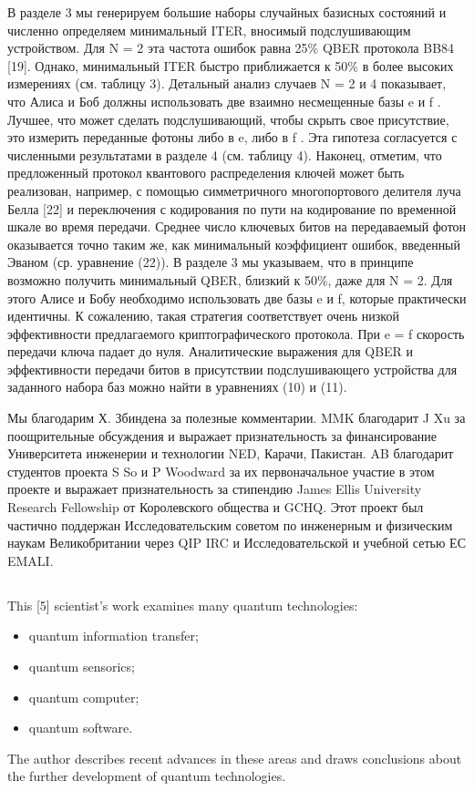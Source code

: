 В разделе 3 мы генерируем большие наборы случайных базисных состояний и численно определяем минимальный ITER, вносимый подслушивающим устройством. Для N = 2 эта частота ошибок равна 25\% QBER протокола BB84 [19]. Однако, минимальный ITER быстро приближается к 50\% в более высоких измерениях (см. таблицу 3). Детальный анализ случаев N = 2 и 4 показывает, что Алиса и Боб должны использовать две взаимно несмещенные базы e и f . Лучшее, что может сделать подслушивающий, чтобы скрыть свое присутствие, это измерить переданные фотоны либо в e, либо в f . Эта гипотеза согласуется с численными результатами в разделе 4 (см. таблицу 4). Наконец, отметим, что предложенный протокол квантового распределения ключей может быть реализован, например, с помощью симметричного многопортового делителя луча Белла [22] и переключения с кодирования по пути на кодирование по временной шкале во время передачи. Среднее число ключевых битов на передаваемый фотон оказывается точно таким же, как минимальный коэффициент ошибок, введенный Эваном (ср. уравнение (22)).
В разделе 3 мы указываем, что в принципе возможно получить минимальный QBER, близкий к 50\%, даже для N = 2. Для этого Алисе и Бобу необходимо использовать две базы e и f, которые практически идентичны. К сожалению, такая стратегия соответствует очень низкой эффективности предлагаемого криптографического протокола. При e = f скорость передачи ключа падает до нуля. Аналитические выражения для QBER и эффективности передачи битов в присутствии подслушивающего устройства для заданного набора баз можно найти в уравнениях (10) и (11).

Мы благодарим Х. Збиндена за полезные комментарии. MMK благодарит J Xu за поощрительные обсуждения и выражает признательность за финансирование Университета инженерии и технологии NED, Карачи, Пакистан. AB благодарит студентов проекта S So и P Woodward за их первоначальное участие в этом проекте и выражает признательность за стипендию James Ellis University Research Fellowship от Королевского общества и GCHQ. Этот проект был частично поддержан Исследовательским советом по инженерным и физическим наукам Великобритании через QIP IRC и Исследовательской и учебной сетью ЕС EMALI.
\subsection{\review}
This [5] scientist's work examines many quantum technologies:
\begin{itemize}
	\item quantum information transfer;
	\item quantum sensorics;
	\item quantum computer;
	\item quantum software.
\end{itemize}
The author describes recent advances in these areas and draws conclusions about the further development of quantum technologies.


\subsection{\dic}
